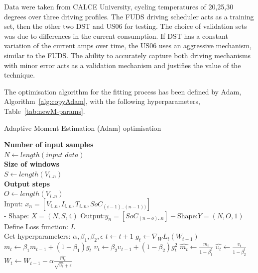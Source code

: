 %
%
Data were taken from CALCE University, cycling temperatures of 20,25,30 degrees over three driving profiles.
The FUDS driving scheduler acts as a training set, then the other two DST and US06 for testing.
The choice of validation sets was due to differences in the current consumption.
If DST has a constant variation of the current amps over time, the US06 uses an aggressive mechanism, similar to the FUDS.
The ability to accurately capture both driving mechanisms with minor error acts as a validation mechanism and justifies the value of the technique.

%
%
The optimisation algorithm for the fitting process has been defined by Adam, \mbox{Algorithm~\ref{alg:copyAdam}}, with the following hyperparameters, \mbox{Table~\ref{tab:newM-params}}.
\begin{algorithm}
    \caption{Adaptive Moment Estimation (Adam) optimisation}
    \begin{algorithmic}[1]
        \STATE \textbf{Number of input samples} \\ $N\gets length(\textit{input data})$\\
        \STATE \textbf{Size of windows} \\ $S\gets length(V_{i..n})$\\
        \STATE \textbf{Output steps} \\ $O\gets length(V_{i..n})$\\
        \STATE Input: $x_n = [V_{i..n}, I_{i..n}, T_{i..n}, SoC_{(i-1)..(n-1))}]$ \\
         - Shape: $X = (N, S, 4)$
        \STATE Output:$y_n = [SoC_{(n-o)..n}] - $Shape:$Y = (N, O, 1)$
        \STATE Define Loss function: $L$ \\
                Get hyperparameters: $\alpha, \beta_1, \beta_2, \epsilon$
        \STATE $t \gets t+1$
        \STATE $g_t \gets \nabla_W L_t (W_{t-1})$ 
        \STATE $m_t \gets \beta_1 m_{t-1}+(1-\beta_1) g_t $ 
        \STATE $\upsilon_t \gets \beta_2 \upsilon_{t-1}+ \left(1-\beta_2 \right)g^2_t $ 
        \STATE $\hat{m_t} \gets \frac{m_t}{1-\beta^t_1}$ 
        \STATE $\hat{\upsilon_t} \gets \frac{\upsilon_t}{1-\beta^t_2} $ 
        \STATE $W_t \gets W_{t-1}- \alpha \frac{\hat{m_t}}{\sqrt{\hat{\upsilon_t}}+\epsilon} $ 
        \ENDWHILE
    \end{algorithmic}
    \label{alg:copyAdam}
\end{algorithm}
